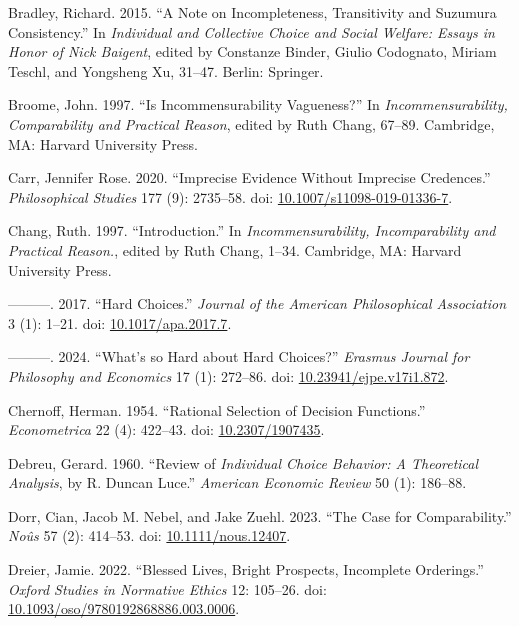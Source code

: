 \documentclass[
  11pt,
  letterpaper,
  DIV=11,
  numbers=noendperiod,
  twoside]{scrartcl}
\newlength{\cslhangindent}
\newenvironment{CSLReferences}[2] %
 {\begin{list}{}{%
  \setlength{\itemindent}{0pt}
  \setlength{\leftmargin}{0pt}
  \setlength{\parsep}{0pt}
  \ifodd #1
   \setlength{\leftmargin}{\cslhangindent}
   \setlength{\itemindent}{-1\cslhangindent}
  \fi
  \setlength{\itemsep}{#2\baselineskip}}}
 {\end{list}}
\begin{document}
\begin{CSLReferences}{1}{0}
Bradley, Richard. 2015. {``A Note on Incompleteness, Transitivity and
Suzumura Consistency.''} In \emph{Individual and Collective Choice and
Social Welfare: Essays in Honor of Nick Baigent}, edited by Constanze
Binder, Giulio Codognato, Miriam Teschl, and Yongsheng Xu, 31--47.
Berlin: Springer.

Broome, John. 1997. {``Is Incommensurability Vagueness?''} In
\emph{Incommensurability, Comparability and Practical Reason}, edited by
Ruth Chang, 67--89. Cambridge, MA: Harvard University Press.

Carr, Jennifer Rose. 2020. {``Imprecise Evidence Without Imprecise
Credences.''} \emph{Philosophical Studies} 177 (9): 2735--58. doi:
\href{https://doi.org/10.1007/s11098-019-01336-7}{10.1007/s11098-019-01336-7}.

Chang, Ruth. 1997. {``Introduction.''} In \emph{Incommensurability,
Incomparability and Practical Reason.}, edited by Ruth Chang, 1--34.
Cambridge, MA: Harvard University Press.

---------. 2017. {``Hard Choices.''} \emph{Journal of the American
Philosophical Association} 3 (1): 1--21. doi:
\href{https://doi.org/10.1017/apa.2017.7}{10.1017/apa.2017.7}.

---------. 2024. {``What's so Hard about Hard Choices?''} \emph{Erasmus
Journal for Philosophy and Economics} 17 (1): 272--86. doi:
\href{https://doi.org/10.23941/ejpe.v17i1.872}{10.23941/ejpe.v17i1.872}.

Chernoff, Herman. 1954. {``Rational Selection of Decision Functions.''}
\emph{Econometrica} 22 (4): 422--43. doi:
\href{https://doi.org/10.2307/1907435}{10.2307/1907435}.

Debreu, Gerard. 1960. {``Review of \emph{Individual Choice Behavior: A
Theoretical Analysis}, by {R. Duncan Luce}.''} \emph{American Economic
Review} 50 (1): 186--88.

Dorr, Cian, Jacob M. Nebel, and Jake Zuehl. 2023. {``The Case for
Comparability.''} \emph{Noûs} 57 (2): 414--53. doi:
\href{https://doi.org/10.1111/nous.12407}{10.1111/nous.12407}.

Dreier, Jamie. 2022. {``Blessed Lives, Bright Prospects, Incomplete
Orderings.''} \emph{Oxford Studies in Normative Ethics} 12: 105--26.
doi:
\href{https://doi.org/10.1093/oso/9780192868886.003.0006}{10.1093/oso/9780192868886.003.0006}.


\end{CSLReferences}
\end{document}
